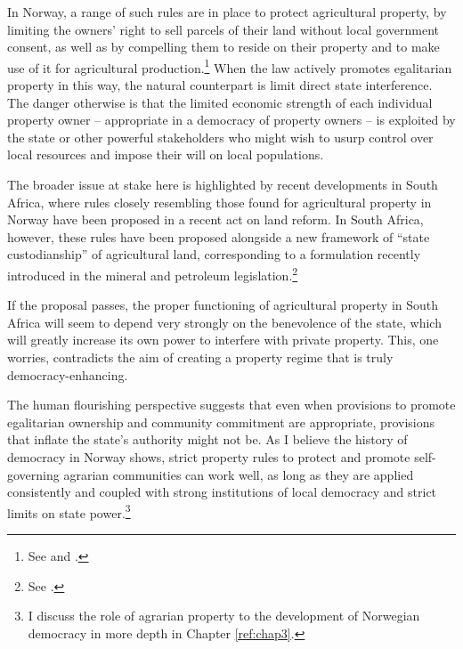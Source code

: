 In Norway, a range of such rules are in place to protect agricultural property, by limiting the owners' right to sell parcels of their land without local government consent, as well as by compelling them to reside on their property and to make use of it for agricultural production.\footnote{See \cite[8|12]{la95} and \cite[4|5]{lca03}.} When the law actively promotes egalitarian property in this way, the natural counterpart is limit direct state interference. The danger otherwise is that the limited economic strength of each individual property owner -- appropriate in a democracy of property owners -- is exploited by the state or other powerful stakeholders who might wish to usurp control over local resources and impose their will on local populations.

The broader issue at stake here is highlighted by recent developments in South Africa, where  rules closely resembling those found for agricultural property in Norway have been proposed in a recent act on land reform. In South Africa, however, these rules have been proposed alongside a new framework of ``state custodianship'' of agricultural land, corresponding to a formulation recently introduced in the mineral and petroleum legislation.\footnote{See \cite{steyn15}.}

If the proposal passes, the proper functioning of agricultural property in South Africa will seem to depend very strongly on the benevolence of the state, which will greatly increase its own power to interfere with private property. This, one worries, contradicts the aim of creating a property regime that is truly democracy-enhancing.

The human flourishing perspective suggests that even when provisions to promote egalitarian ownership and community commitment are appropriate, provisions that inflate the state's authority might not be. As I believe the history of democracy in Norway shows, strict property rules to protect and promote self-governing agrarian communities can work well, as long as they are applied consistently and coupled with strong institutions of local democracy and strict limits on state power.\footnote{I discuss the role of agrarian property to the development of Norwegian democracy in more depth in Chapter \ref{ref:chap3}.}

